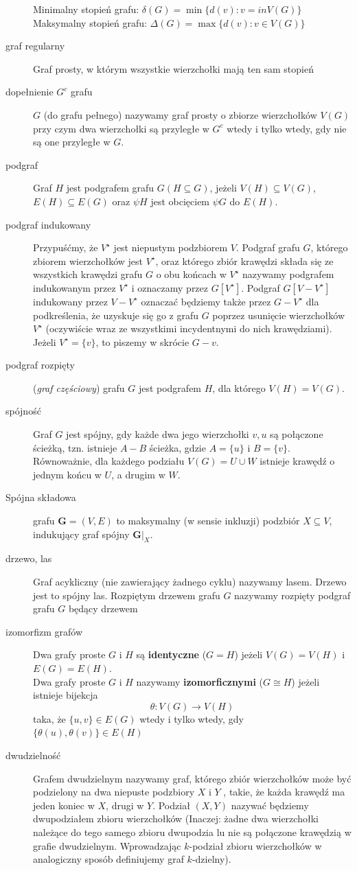 \begin{description}
Minimalny stopień grafu: $\delta (G) = \min \{d(v):v=in V(G)\}$\\
Maksymalny stopień grafu: $\Delta (G) = \max \{d(v):v\in V(G)\}$
\item[graf regularny] Graf prosty, w którym wszystkie wierzchołki mają ten sam stopień 
\item[dopełnienie $G^c$ grafu] $G$ (do grafu pełnego) nazywamy graf prosty o zbiorze
wierzchołków $V (G)$ przy czym dwa wierzchołki są przyległe w $G^c$ wtedy i tylko wtedy, gdy nie są one przyległe w $G$.
\item[podgraf] Graf $H$ jest podgrafem grafu $G (H \subseteq G )$, jeżeli $V(H) \subseteq V(G)$, $E(H) \subseteq E(G)$ oraz $\psi H$ jest obcięciem $\psi G$ do $E(H)$.
\item[podgraf indukowany] Przypuśćmy, że $V^\star$ jest niepustym podzbiorem $V$. Podgraf grafu $G$, którego zbiorem wierzchołków jest $V^\star$, oraz którego zbiór krawędzi składa się ze wszystkich krawędzi grafu $G$ o obu końcach w $V^\star$ nazywamy podgrafem indukowanym przez $V^\star $ i oznaczamy przez $G[V^\star ]$. Podgraf $G[V -V^\star ]$ indukowany przez $V - V^\star $ oznaczać będziemy także przez $G - V^\star$ dla podkreślenia, że uzyskuje się go z grafu $G$ poprzez usunięcie wierzchołków $V^\star $ (oczywiście wraz ze wszystkimi incydentnymi do nich krawędziami). Jeżeli $V^\star = \{v\}$, to piszemy w skrócie $G - v$.
\item[podgraf rozpięty] (\textit{graf częściowy}) grafu $G$ jest podgrafem $H$, dla którego $V (H) = V (G)$.
\item[spójność] Graf $G$ jest spójny, gdy każde dwa jego wierzchołki $v, u$ są połączone ścieżką, tzn. istnieje $A - B$ ścieżka, gdzie $A = \{u\}$ i $B = \{v\}$. Równoważnie, dla każdego podziału $V (G) = U\cup W$ istnieje krawędź o jednym końcu w $U$, a drugim w $W$.
\item[Spójna składowa] grafu $\mathbf{G}=\left(V,E\right)$ to maksymalny (w sensie inkluzji) podzbiór $X\subseteq V$, indukujący graf spójny $\mathbf{G}|_X$.
\item[drzewo, las] Graf acykliczny (nie zawierający żadnego cyklu) nazywamy lasem. Drzewo jest to spójny las. Rozpiętym drzewem grafu $G$ nazywamy rozpięty podgraf grafu $G$ będący drzewem
\item[izomorfizm grafów] Dwa grafy proste $G$ i $H$ są \textbf{identyczne} ($G = H$) jeżeli $V(G) = V(H)$ i $E(G) = E(H)$.\\
Dwa grafy proste $G$ i $H$ nazywamy \textbf{izomorficznymi} ($G \cong H$) jeżeli istnieje bijekcja
$$\theta :V(G)\rightarrow V(H)$$
taka, że
$\{u, v\} \in E(G)$ wtedy i tylko wtedy, gdy $\{\theta (u), \theta (v)\} \in E(H)$
\item[dwudzielność] Grafem dwudzielnym nazywamy graf, którego zbiór wierzchołków może być podzielony na dwa niepuste podzbiory $X$ i $Y$ , takie, że każda krawędź ma jeden koniec w $X$, drugi w $Y$. Podział $(X, Y)$ nazywać będziemy dwupodziałem zbioru wierzchołków (Inaczej: żadne dwa wierzchołki należące do tego samego zbioru dwupodzia lu nie są połączone krawędzią w grafie dwudzielnym. Wprowadzając $k$-podział zbioru wierzchołków w analogiczny sposób definiujemy graf $k$-dzielny).
\end{description}

